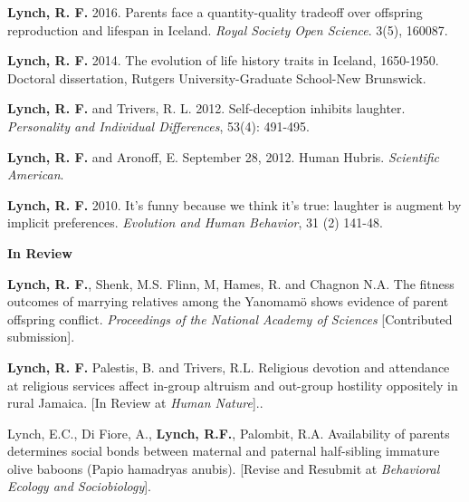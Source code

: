 \documentclass[letterpaper,11pt]{article}
\begin{document}
{{{{\begin{flushleft}
{\textbf {Lynch, R. F.}  2016. Parents face a quantity-quality tradeoff over offspring reproduction and lifespan in Iceland.  \textit{Royal Society Open Science}. 3(5), 160087.}
\end{flushleft}
\begin{flushleft}
{\textbf {Lynch, R. F.} 2014. The evolution of life history traits in Iceland, 1650-1950. Doctoral dissertation, Rutgers University-Graduate School-New Brunswick.}
\end{flushleft}
\begin{flushleft}
{\textbf {Lynch, R. F.} and Trivers, R. L. 2012. Self-deception inhibits laughter. \textit{Personality and Individual Differences}, 53(4): 491-495.}
\end{flushleft}
\begin{flushleft}
{\textbf {Lynch, R. F.}  and Aronoff, E. September 28, 2012. Human Hubris. \textit{Scientific American}.}
\end{flushleft}
\begin{flushleft}
{\textbf {Lynch, R. F.} 2010.  It’s funny because we think it’s true: laughter is augment by implicit preferences. \textit {Evolution and Human Behavior}, 31 (2) 141-48.}
\end{flushleft}

\center
\large\textbf{In Review}

\begin{flushleft}
{\textbf {Lynch, R. F.}, Shenk, M.S. Flinn, M, Hames, R. and Chagnon N.A.  The fitness outcomes of marrying relatives among the Yanomamö shows evidence of parent offspring conflict. \textit{Proceedings of the National Academy of Sciences} [Contributed submission].}
\end{flushleft}

\begin{flushleft}
{\textbf {Lynch, R. F.} Palestis, B. and Trivers, R.L.  Religious devotion and attendance at religious services affect in-group altruism and out-group hostility oppositely in rural Jamaica. [In Review at \textit {Human Nature}]..}
\end{flushleft}

\begin{flushleft}
{Lynch, E.C., Di Fiore, A.,\textbf { Lynch, R.F.}, Palombit, R.A. Availability of parents determines social bonds between maternal and paternal half-sibling immature olive baboons (Papio hamadryas anubis). [Revise and Resubmit at \textit{Behavioral Ecology and Sociobiology}]. }
\end{flushleft}

}}}}
\end{document}
